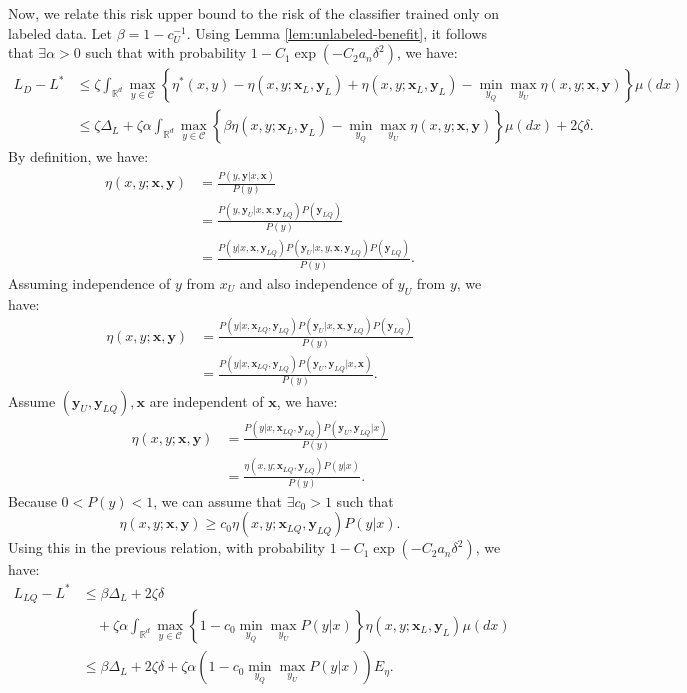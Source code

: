 \documentclass[12pt]{article}
\begin{document}
	Now, we relate this risk upper bound to the risk of the classifier trained only on labeled data. Let $\beta = 1 - c_U^{-1}$. Using Lemma \ref{lem:unlabeled-benefit}, it follows that $\exists \alpha > 0$ such that with probability $1 - C_1 \exp(-C_2 a_n \delta^2)$, we have:
	\begin{align}
		L_D - L^* &\le \zeta \int_{\mathbb{R}^d} \max_{y \in \mathcal{C}} \left\{ \eta^*(x, y) - \eta(x, y; \mathbf{x}_L, \mathbf{y}_L) + \eta(x, y; \mathbf{x}_L, \mathbf{y}_L) - \min_{y_Q} \max_{y_U} \eta(x, y; \mathbf{x}, \mathbf{y}) \right\} \mu(dx) \\
		&\le \zeta \Delta_L + \zeta \alpha \int_{\mathbb{R}^d} \max_{y \in \mathcal{C}} \left\{ \beta \eta(x, y; \mathbf{x}_L, \mathbf{y}_L) - \min_{y_Q} \max_{y_U} \eta(x, y; \mathbf{x}, \mathbf{y}) \right\} \mu(dx) + 2\zeta \delta.
	\end{align}
	By definition, we have:
	\begin{align}
		\eta(x, y; \mathbf{x}, \mathbf{y}) &= \frac{P(y, \mathbf{y}|x, \mathbf{x})}{P(y)} \\
		&= \frac{P(y, \mathbf{y}_U|x, \mathbf{x}, \mathbf{y}_{LQ}) P(\mathbf{y}_{LQ})}{P(y)} \\
		&= \frac{P(y|x, \mathbf{x}, \mathbf{y}_{LQ}) P(\mathbf{y}_U|x, y, \mathbf{x}, \mathbf{y}_{LQ}) P(\mathbf{y}_{LQ})}{P(y)}.
	\end{align}
	Assuming independence of $y$ from $x_U$ and also independence of $y_U$ from $y$, we have:
	\begin{align}
		\eta(x, y; \mathbf{x}, \mathbf{y}) &= \frac{P(y|x, \mathbf{x}_{LQ}, \mathbf{y}_{LQ}) P(\mathbf{y}_U|x, \mathbf{x}, \mathbf{y}_{LQ}) P(\mathbf{y}_{LQ})}{P(y)} \\
		&= \frac{P(y|x, \mathbf{x}_{LQ}, \mathbf{y}_{LQ}) P(\mathbf{y}_U, \mathbf{y}_{LQ}|x, \mathbf{x})}{P(y)}.
	\end{align}
	Assume $(\mathbf{y}_U, \mathbf{y}_{LQ}), \mathbf{x}$ are independent of $\mathbf{x}$, we have:
	\begin{align}
		\eta(x, y; \mathbf{x}, \mathbf{y}) &= \frac{P(y|x, \mathbf{x}_{LQ}, \mathbf{y}_{LQ}) P(\mathbf{y}_U, \mathbf{y}_{LQ}|x)}{P(y)} \\
		&= \frac{\eta(x, y; \mathbf{x}_{LQ}, \mathbf{y}_{LQ}) P(y|x)}{P(y)}.
	\end{align}
	Because $0 < P(y) < 1$, we can assume that $\exists c_0 > 1$ such that
	\begin{equation}
		\eta(x, y; \mathbf{x}, \mathbf{y}) \ge c_0 \eta(x, y; \mathbf{x}_{LQ}, \mathbf{y}_{LQ}) P(y|x).
	\end{equation}
	Using this in the previous relation, with probability $1 - C_1 \exp(-C_2 a_n \delta^2)$, we have:
	\begin{align}
		L_{LQ} - L^* &\le \beta \Delta_L + 2\zeta \delta \\
		&\quad + \zeta \alpha \int_{\mathbb{R}^d} \max_{y \in \mathcal{C}} \left\{ 1 - c_0 \min_{y_Q} \max_{y_U} P(y|x) \right\} \eta(x, y; \mathbf{x}_L, \mathbf{y}_L) \mu(dx) \\
		&\le \beta \Delta_L + 2\zeta \delta + \zeta \alpha \left( 1 - c_0 \min_{y_Q} \max_{y_U} P(y|x) \right) E_\eta.
	\end{align}
	
\end{document}
